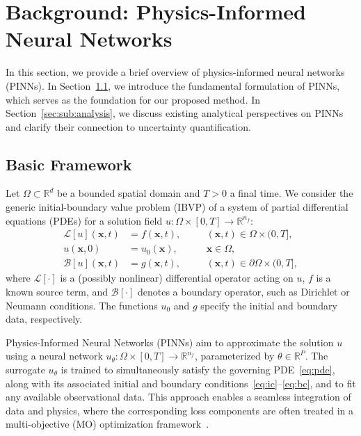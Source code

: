\documentclass[preprint,12pt]{elsarticle}
\begin{document}
\section{Background: Physics-Informed Neural Networks}
\label{sec:pinn}

In this section, we provide a brief overview of physics-informed neural networks (PINNs). In Section~\ref{sec:sub:basics}, we introduce the fundamental formulation of PINNs, which serves as the foundation for our proposed method. In Section~\ref{sec:sub:analysis}, we discuss existing analytical perspectives on PINNs and clarify their connection to uncertainty quantification.

\subsection{Basic Framework}
\label{sec:sub:basics}

Let $\Omega \subset \mathbb{R}^d$ be a bounded spatial domain and $T > 0$ a final time. We consider the generic initial-boundary value problem (IBVP) of a system of partial differential equations (PDEs) for a solution field $u: \Omega \times [0, T] \to \mathbb{R}^{n_f}$:
\begin{align}
\mathcal{L}[u](\mathbf{x},t) &= f(\mathbf{x},t), &&\quad (\mathbf{x},t) \in \Omega \times (0,T], \label{eq:pde}\\
u(\mathbf{x},0) &= u_0(\mathbf{x}), &&\quad \mathbf{x} \in \Omega, \label{eq:ic} \\
\mathcal{B}[u](\mathbf{x},t) &= g(\mathbf{x},t), &&\quad (\mathbf{x},t) \in \partial\Omega \times (0,T], \label{eq:bc}
\end{align}
where $\mathcal{L}[\cdot]$ is a (possibly nonlinear) differential operator acting on $u$, $f$ is a known source term, and $\mathcal{B}[\cdot]$ denotes a boundary operator, such as Dirichlet or Neumann conditions. The functions $u_0$ and $g$ specify the initial and boundary data, respectively.

Physics-Informed Neural Networks (PINNs) aim to approximate the solution $u$ using a neural network $u_\theta : \Omega \times [0,T] \to \mathbb{R}^{n_f}$, parameterized by $\theta \in \mathbb{R}^P$. The surrogate $u_\theta$ is trained to simultaneously satisfy the governing PDE~\eqref{eq:pde}, along with its associated initial and boundary conditions~\eqref{eq:ic}–\eqref{eq:bc}, and to fit any available observational data. This approach enables a seamless integration of data and physics, where the corresponding loss components are often treated in a multi-objective (MO) optimization framework~\cite{rohrhofer2023data}.
\end{document}
